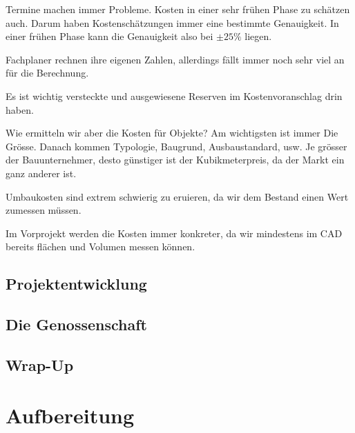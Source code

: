\documentclass[11pt]{article}
\begin{document}
Termine machen immer Probleme. Kosten in einer sehr frühen Phase zu schätzen
auch. Darum haben Kostenschätzungen immer eine bestimmte Genauigkeit. In
einer frühen Phase kann die Genauigkeit also bei $\pm 25\%$ liegen.

Fachplaner rechnen ihre eigenen Zahlen, allerdings fällt immer noch sehr viel
an für die Berechnung.

Es ist wichtig versteckte und ausgewiesene Reserven im Kostenvoranschlag drin
haben.

Wie ermitteln wir aber die Kosten für Objekte? Am wichtigsten ist immer Die
Grösse. Danach kommen Typologie, Baugrund, Ausbaustandard, usw. Je grösser
der Bauunternehmer, desto günstiger ist der Kubikmeterpreis, da der Markt ein
ganz anderer ist.

Umbaukosten sind extrem schwierig zu eruieren, da wir dem Bestand einen Wert
zumessen müssen.

Im Vorprojekt werden die Kosten immer konkreter, da wir mindestens im CAD
bereits flächen und Volumen messen können.

\subsection{Projektentwicklung}
\label{sec-2-6}

\subsection{Die Genossenschaft}
\label{sec-2-7}

\subsection{Wrap-Up}
\label{sec-2-8}

\section{Aufbereitung}
\label{sec-3}
\end{document}
